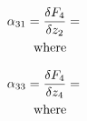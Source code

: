 \documentclass[11pt,a4paper]{article}
\begin{document}
\begin{appendices}
\begin{align}
    \alpha_{31} = \fdv{F_4}{z_2} &=
    \label{math:alpha_31_matrix}\\
    \text{where}\nonumber\\
\end{align}

\begin{align}
    \alpha_{33} = \fdv{F_4}{z_4} &=
    \label{math:alpha_33_matrix}\\
    \text{where}\nonumber\\
\end{align}


\end{appendices}
\end{document}
